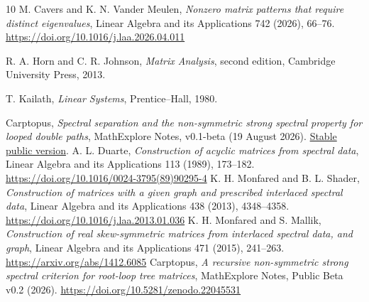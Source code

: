 \documentclass[11pt]{article}
\theoremstyle{remark}
\begin{document}
\begin{thebibliography}{10}
 M. Cavers and K. N. Vander Meulen, \emph{Nonzero matrix patterns that require distinct eigenvalues}, Linear Algebra and its Applications 742 (2026), 66--76. \url{https://doi.org/10.1016/j.laa.2026.04.011}

 R. A. Horn and C. R. Johnson, \emph{Matrix Analysis}, second edition, Cambridge University Press, 2013.

 T. Kailath, \emph{Linear Systems}, Prentice--Hall, 1980.

 Carptopus, \emph{Spectral separation and the non-symmetric strong spectral property for looped double paths}, MathExplore Notes, v0.1-beta (19 August 2026). \href{https://github.com/Carptopus/MathExplore-Notes/tree/e57ee007380cbc351eb371d8e991303cab5f1e48/research/nssp-looped-double-paths}{Stable public version}.
 A. L. Duarte, \emph{Construction of acyclic matrices from spectral data}, Linear Algebra and its Applications 113 (1989), 173--182. \url{https://doi.org/10.1016/0024-3795(89)90295-4}
 K. H. Monfared and B. L. Shader, \emph{Construction of matrices with a given graph and prescribed interlaced spectral data}, Linear Algebra and its Applications 438 (2013), 4348--4358. \url{https://doi.org/10.1016/j.laa.2013.01.036}
 K. H. Monfared and S. Mallik, \emph{Construction of real skew-symmetric matrices from interlaced spectral data, and graph}, Linear Algebra and its Applications 471 (2015), 241--263. \url{https://arxiv.org/abs/1412.6085}
 Carptopus, \emph{A recursive non-symmetric strong spectral criterion for root-loop tree matrices}, MathExplore Notes, Public Beta v0.2 (2026). \url{https://doi.org/10.5281/zenodo.22045531}
\end{thebibliography}
\end{document}
